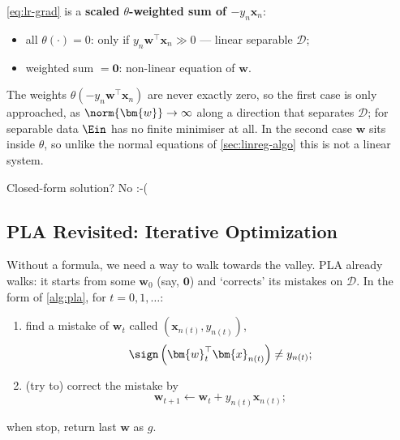 \begin{center}
    \begin{minipage}[c]{0.3\textwidth}
        \centering
    \end{minipage}%
    \begin{minipage}[c]{0.66\textwidth}
        \eqref{eq:lr-grad} is a \textbf{scaled \(\theta\)-weighted sum of
        \(-y_n \bm{x}_n\)}:
        \begin{itemize}
            \item all \(\theta(\cdot) = 0\): only if \(y_n \bm{w}^\top \bm{x}_n
                \gg 0\) --- linear separable \(\mathcal{D}\);
            \item weighted sum \(= \bm{0}\): non-linear equation of \(\bm{w}\).
        \end{itemize}
    \end{minipage}
\end{center}

The weights \(\theta(-y_n \bm{w}^\top \bm{x}_n)\) are never exactly zero, so
the first case is only approached, as \(\norm{\bm{w}} \to \infty\) along a
direction that separates \(\mathcal{D}\); for separable data \(\Ein\) has no
finite minimiser at all. In the second case \(\bm{w}\) sits inside \(\theta\),
so unlike the normal equations of \autoref{sec:linreg-algo} this is not a linear
system.

\begin{moral}
    Closed-form solution? No :-(
\end{moral}

\subsection{PLA Revisited: Iterative Optimization}

Without a formula, we need a way to walk towards the valley. PLA already walks:
it starts from some \(\bm{w}_0\) (say, \(\bm{0}\)) and `corrects' its mistakes
on \(\mathcal{D}\). In the form of \autoref{alg:pla}, for \(t = 0, 1, \dots\):

\begin{enumerate}
    \item find a mistake of \(\bm{w}_t\) called \((\bm{x}_{n(t)}, y_{n(t)})\),
        \[
            \sign \left( \bm{w}_t^\top \bm{x}_{n(t)} \right) \neq y_{n(t)} ;
        \]
    \item (try to) correct the mistake by
        \[
            \bm{w}_{t+1} \gets \bm{w}_t + y_{n(t)} \bm{x}_{n(t)} ;
        \]
\end{enumerate}
when stop, return last \(\bm{w}\) as \(g\).

